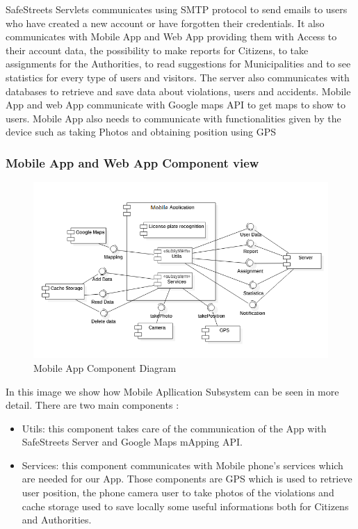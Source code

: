 SafeStreets Servlets communicates using SMTP protocol to send emails to users who have created a new account
or have forgotten their credentials. It also communicates with Mobile App and Web App providing them with Access to
their account data, the possibility to make reports for Citizens, to take assignments for the Authorities,
to read suggestions for Municipalities and to see statistics for every type of users and visitors. The server
also communicates with databases to retrieve and save data about violations, users and accidents. Mobile
App and web App  communicate with Google maps API to get maps to show to users. Mobile App
also needs to communicate with functionalities given by the device such as taking Photos and obtaining
position using GPS
\subsubsection{Mobile App and Web App  Component view}
\begin{figure}[H]
\centering
\includegraphics{Images/MobileApplicationComponent.png}
\caption{\label{fig:ComWI} Mobile App Component Diagram}
\end{figure}
In this image we show how Mobile Apllication Subsystem can be seen in more detail.
There are two main components : 
\begin{itemize}
\item Utils:  this component takes care of the communication of the App with SafeStreets Server and Google Maps mApping API.
\item Services: this component communicates with Mobile phone's services which are needed for our App. Those components are GPS which is used to retrieve user position, the phone camera user to take photos of the violations and cache storage used to save locally some useful informations both for Citizens and Authorities.
\end{itemize}

